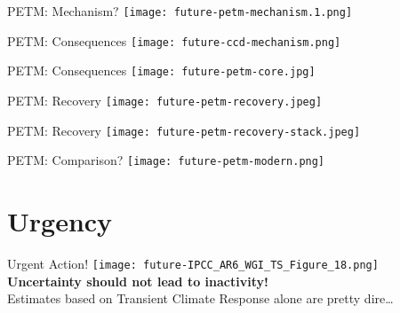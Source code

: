 \begin{frame}{PETM: Mechanism?}
    \centering
    \texttt{[image: future-petm-mechanism.1.png]}
\end{frame}

\begin{frame}{PETM: Consequences}
    \centering
    \texttt{[image: future-ccd-mechanism.png]}
\end{frame}

\begin{frame}{PETM: Consequences}
    \centering
    \texttt{[image: future-petm-core.jpg]}
\end{frame}

\begin{frame}{PETM: Recovery}
    \centering
    \texttt{[image: future-petm-recovery.jpeg]}
\end{frame}

\begin{frame}{PETM: Recovery}
    \centering
    \texttt{[image: future-petm-recovery-stack.jpeg]}
\end{frame}

\begin{frame}{PETM: Comparison?}
    \centering
    \texttt{[image: future-petm-modern.png]}
\end{frame}

\section{Urgency}

\begin{frame}{Urgent Action!}
    \centering
    \texttt{[image: future-IPCC\_AR6\_WGI\_TS\_Figure\_18.png]}
    \textbf{Uncertainty should not lead to inactivity!}\\Estimates based on Transient Climate Response alone are pretty dire\dots
\end{frame}







